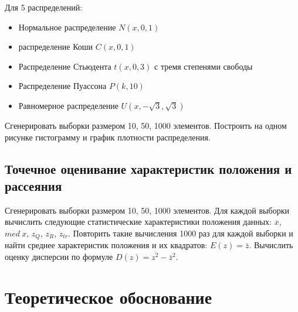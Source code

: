 \documentclass[12pt,a4paper]{article}
\begin{document}
	Для 5 распределений:

	\begin{itemize}
	\item Нормальное распределение \( N(x, 0, 1) \)
	\item распределение Коши \( C(x, 0, 1) \)
	\item Распределение Стьюдента \( t(x, 0, 3) \) с тремя степенями свободы
	\item Распределение Пуассона \( P(k, 10) \)
	\item Равномерное распределение \( U(x, -\sqrt3, \sqrt3) \)
	\end{itemize}

	Сгенерировать выборки размером 10, 50, 1000 элементов.
	Построить на одном рисунке гистограмму и график плотности распределения.

	\subsection{Точечное оценивание характеристик положения и рассеяния}

	Сгенерировать выборки размером 10, 50, 1000 элементов.
	Для каждой выборки вычислить следующие статистические характеристики
	положения данных: \( \overline{x} \), \( med\:x \), \( z_{Q} \), \( z_{R} \),
	\( z_{tr} \). Повторить такие вычисления 1000 раз для каждой выборки и
	найти среднее характеристик положения и их квадратов:
	\( E(z) = \bar{z} \). Вычислить оценку дисперсии по формуле
	\( D(z) = \overline{z^2} - \overline{z}^2 \).

	\section{Теоретическое обоснование}
\end{document}
